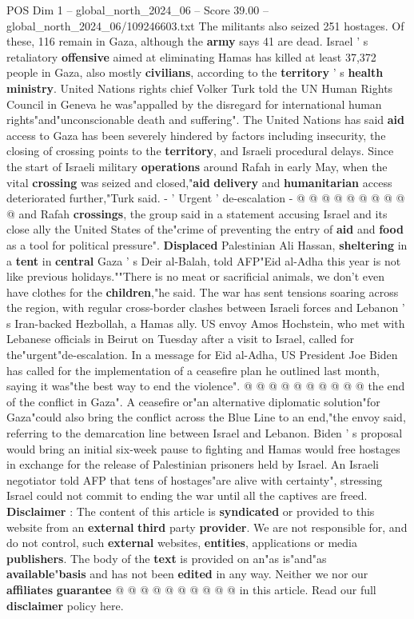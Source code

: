 \begin{textsample}{POS Dim 1 – global\_north\_2024\_06 – Score 39.00 – global\_north\_2024\_06/109246603.txt}
The militants also seized 251 hostages.
Of these, 116 remain in Gaza, although the \textbf{army} says 41 are dead.
Israel ' s retaliatory \textbf{offensive} aimed at eliminating Hamas has killed at least 37,372 people in Gaza, also mostly \textbf{civilians}, according to the \textbf{territory} ' s \textbf{health} \textbf{ministry}.
United Nations rights chief Volker Turk told the UN Human Rights Council in Geneva he was"appalled by the disregard for international human rights"and"unconscionable death and suffering".
The United Nations has said \textbf{aid} access to Gaza has been severely hindered by factors including insecurity, the closing of crossing points to the \textbf{territory}, and Israeli procedural delays.
Since the start of Israeli military \textbf{operations} around Rafah in early May, when the vital \textbf{crossing} was seized and closed,"\textbf{aid} \textbf{delivery} and \textbf{humanitarian} access deteriorated further,"Turk said. - ' Urgent ' de-escalation - @ @ @ @ @ @ @ @ @ @ and Rafah \textbf{crossings}, the group said in a statement accusing Israel and its close ally the United States of the"crime of preventing the entry of \textbf{aid} and \textbf{food} as a tool for political pressure". \textbf{Displaced} Palestinian Ali Hassan, \textbf{sheltering} in a \textbf{tent} in \textbf{central} Gaza ' s Deir al-Balah, told AFP"Eid al-Adha this year is not like previous holidays.""There is no meat or sacrificial animals, we don't even have clothes for the \textbf{children},"he said.
The war has sent tensions soaring across the region, with regular cross-border clashes between Israeli forces and Lebanon ' s Iran-backed Hezbollah, a Hamas ally.
US envoy Amos Hochstein, who met with Lebanese officials in Beirut on Tuesday after a visit to Israel, called for the"urgent"de-escalation.
In a message for Eid al-Adha, US President Joe Biden has called for the implementation of a ceasefire plan he outlined last month, saying it was"the best way to end the violence". @ @ @ @ @ @ @ @ @ @ the end of the conflict in Gaza".
A ceasefire or"an alternative diplomatic solution"for Gaza"could also bring the conflict across the Blue Line to an end,"the envoy said, referring to the demarcation line between Israel and Lebanon.
Biden ' s proposal would bring an initial six-week pause to fighting and Hamas would free hostages in exchange for the release of Palestinian prisoners held by Israel.
An Israeli negotiator told AFP that tens of hostages"are alive with certainty", stressing Israel could not commit to ending the war until all the captives are freed. \textbf{Disclaimer} : The content of this article is \textbf{syndicated} or provided to this website from an \textbf{external} \textbf{third} party \textbf{provider}.
We are not responsible for, and do not control, such \textbf{external} websites, \textbf{entities}, applications or media \textbf{publishers}.
The body of the \textbf{text} is provided on an"as is"and"as \textbf{available}"\textbf{basis} and has not been \textbf{edited} in any way.
Neither we nor our \textbf{affiliates} \textbf{guarantee} @ @ @ @ @ @ @ @ @ @ in this article.
Read our full \textbf{disclaimer} policy here.


\end{textsample}
